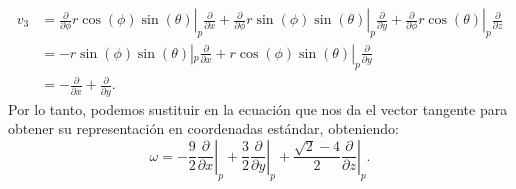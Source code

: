 \begin{example}
\begin{align*}
		v_3 & =
		\left. \frac{\partial}{\partial \phi} r\cos(\phi)\sin(\theta) \right|_p
		\frac{\partial}{\partial x} +
		\left. \frac{\partial}{\partial \phi} r\sin(\phi)\sin(\theta)\right|_p
		\frac{\partial}{\partial y} +
		\left. \frac{\partial}{\partial \phi} r\cos(\theta)\right|_{p}
		\frac{\partial}{\partial z}                                          \\
		    & = -r\sin(\phi)\sin(\theta)|_p \frac{\partial}{\partial x}
		+ r\cos(\phi)\sin(\theta)|_p  \frac{\partial}{\partial y}            \\
		    & = - \frac{\partial}{\partial x} + \frac{\partial}{\partial y}.
	\end{align*}
	Por lo tanto, podemos sustituir en la ecuación que nos da el vector tangente para obtener su representación en coordenadas estándar, obteniendo:
	\[ \omega =
		\left. -\frac{9}{2} \frac{\partial}{\partial x} \right|_p +
		\left. \frac{3}{2}\frac{\partial}{\partial y} \right|_p +
		\left. \frac{\sqrt{2} - 4}{2} \frac{\partial}{\partial z} \right|_p .\]
\end{example}

